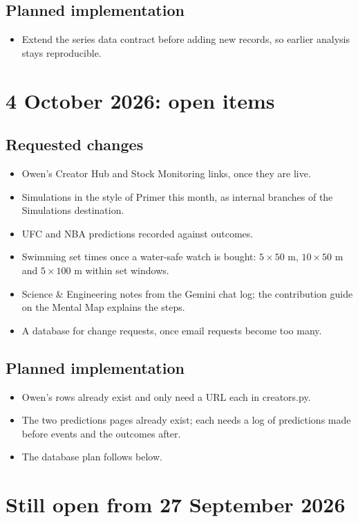 \documentclass[11pt]{article}
\begin{document}
\subsection{Planned implementation}
\begin{itemize}
\item Extend the series data contract before adding new records, so earlier analysis stays reproducible.
\end{itemize}

\section{4 October 2026: open items}
\subsection{Requested changes}
\begin{itemize}
\item Owen's Creator Hub and Stock Monitoring links, once they are live.
\item Simulations in the style of Primer this month, as internal branches of the Simulations destination.
\item UFC and NBA predictions recorded against outcomes.
\item Swimming set times once a water-safe watch is bought: $5 \times 50$ m, $10 \times 50$ m and $5 \times 100$ m within set windows.
\item Science \& Engineering notes from the Gemini chat log; the contribution guide on the Mental Map explains the steps.
\item A database for change requests, once email requests become too many.
\end{itemize}
\subsection{Planned implementation}
\begin{itemize}
\item Owen's rows already exist and only need a URL each in creators.py.
\item The two predictions pages already exist; each needs a log of predictions made before events and the outcomes after.
\item The database plan follows below.
\end{itemize}

\section{Still open from 27 September 2026}
\end{document}
